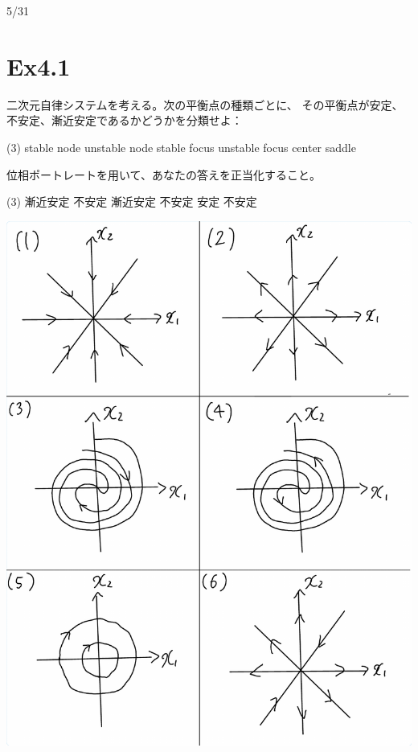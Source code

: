 \documentclass{jsarticle}
\begin{document}
5/31

\section*{Ex4.1}
二次元自律システムを考える。次の平衡点の種類ごとに、
その平衡点が安定、不安定、漸近安定であるかどうかを分類せよ：
\begin{tasks}(3) %
  \task stable node 
  \task unstable node
  \task stable focus
  \task unstable focus 
  \task center
  \task saddle
\end{tasks}
位相ポートレートを用いて、あなたの答えを正当化すること。

{\color{gray}\hrulefill}

\begin{tasks}(3) %
  \task 漸近安定
  \task 不安定
  \task 漸近安定
  \task 不安定
  \task 安定
  \task 不安定
\end{tasks}

\includegraphics[width=14cm]{fig.pdf}
\end{document}
